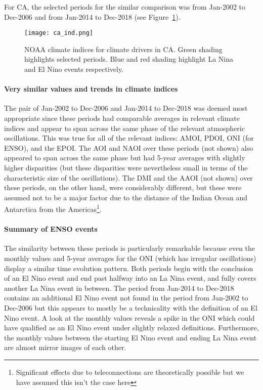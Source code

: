 For \ac{CA}, the selected periods for the similar comparison was from Jan-2002 to Dec-2006 and from Jan-2014 to Dec-2018 (see Figure~\ref{fig:ca_ind}).

\begin{figure}[!htp]
	\centering
	\texttt{[image: ca\_ind.png]}
	\caption[CA's and SA's relevant climate indices for similar comparison]{\ac{NOAA} climate indices for climate drivers in \ac{CA}. Green shading highlights selected periods. Blue and red shading highlight La Nina and El Nino events respectively.}
	\label{fig:ca_ind}
\end{figure}

\paragraph{Very similar values and trends in climate indices}

The pair of Jan-2002 to Dec-2006 and Jan-2014 to Dec-2018 was deemed most appropriate since these periods had comparable averages in relevant climate indices and appear to span across the same phase of the relevant atmospheric oscillations. This was true for all of the relevant indices: \ac{AMOI}, \ac{PDOI}, \ac{ONI} (for \ac{ENSO}), and the \ac{EPOI}. The \ac{AOI} and \ac{NAOI} over these periods (not shown) also appeared to span across the same phase but had 5-year averages with slightly higher disparities (but these disparities were nevertheless small in terms of the characteristic size of the oscillations). The \ac{DMI} and the \ac{AAOI} (not shown) over these periods, on the other hand, were considerably different, but these were assumed not to be a major factor due to the distance of the Indian Ocean and Antarctica from the Americas\footnote{Significant effects due to teleconnections are theoretically possible but we have assumed this isn't the case here}.

\paragraph{Summary of ENSO events}

The similarity between these periods is particularly remarkable because even the monthly values and 5-year averages for the \ac{ONI} (which has irregular oscillations) display a similar time evolution pattern. Both periods begin with the conclusion of an El Nino event and end past halfway into an La Nina event, and fully covers another La Nina event in between. The period from Jan-2014 to Dec-2018 contains an additional El Nino event not found in the period from Jan-2002 to Dec-2006 but this appears to mostly be a technicality with the definition of an El Nino event. A look at the monthly values reveals a spike in the \ac{ONI} which could have qualified as an El Nino event under slightly relaxed definitions. Furthermore, the monthly values between the starting El Nino event and ending La Nina event are almost mirror images of each other.

